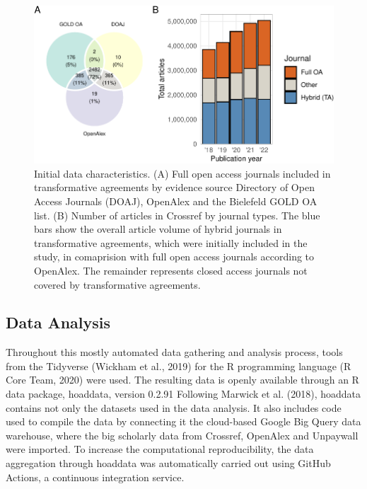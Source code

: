 \documentclass[a4paper,man,floatsintext,longtable,noextraspace,12pt]{apa6}
\begin{document}
\begin{figure}[ht!]

{\centering \includegraphics[width=0.99\linewidth,]{fig/method_fig-1} 

}

\caption{Initial data characteristics. (A) Full open access journals included in transformative agreements by evidence source Directory of Open Access Journals (DOAJ), OpenAlex and the Bielefeld GOLD OA list. (B) Number of articles in Crossref by journal types. The blue bars show the overall article volume of hybrid journals in transformative agreements, which were initially included in the study, in comaprision with full open access journals according to OpenAlex. The remainder represents closed access journals not covered by transformative agreements.}\label{fig:method_fig}
\end{figure}

\hypertarget{data-analysis}{%
\subsection{Data Analysis}\label{data-analysis}}

Throughout this mostly automated data gathering and analysis process,
tools from the Tidyverse (Wickham et al., 2019) for the R programming
language (R Core Team, 2020) were used. The resulting data is openly
available through an R data package, hoaddata, version 0.2.91 Following
Marwick et al. (2018), hoaddata contains not only the datasets used in
the data analysis. It also includes code used to compile the data by
connecting it the cloud-based Google Big Query data warehouse, where the
big scholarly data from Crossref, OpenAlex and Unpaywall were imported.
To increase the computational reproducibility, the data aggregation
through hoaddata was automatically carried out using GitHub Actions, a
continuous integration service.
\end{document}
